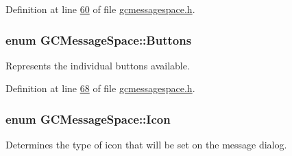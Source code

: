 \-Definition at line \hyperlink{gcmessagespace_8h_source_l00060}{60} of file \hyperlink{gcmessagespace_8h_source}{gcmessagespace.\-h}.

\hypertarget{namespace_g_c_message_space_a631906a7d53f30328cf2249a00078b5b}{
\subsubsection[{\-Buttons}]{\setlength{\rightskip}{0pt plus 5cm}enum {\bf \-G\-C\-Message\-Space\-::\-Buttons}}}\label{namespace_g_c_message_space_a631906a7d53f30328cf2249a00078b5b}


\-Represents the individual buttons available. 



\-Definition at line \hyperlink{gcmessagespace_8h_source_l00068}{68} of file \hyperlink{gcmessagespace_8h_source}{gcmessagespace.\-h}.

\hypertarget{namespace_g_c_message_space_a67e94586e09cbc305257fbcdd7b686e2}{
\subsubsection[{\-Icon}]{\setlength{\rightskip}{0pt plus 5cm}enum {\bf \-G\-C\-Message\-Space\-::\-Icon}}}\label{namespace_g_c_message_space_a67e94586e09cbc305257fbcdd7b686e2}


\-Determines the type of icon that will be set on the message dialog. 

